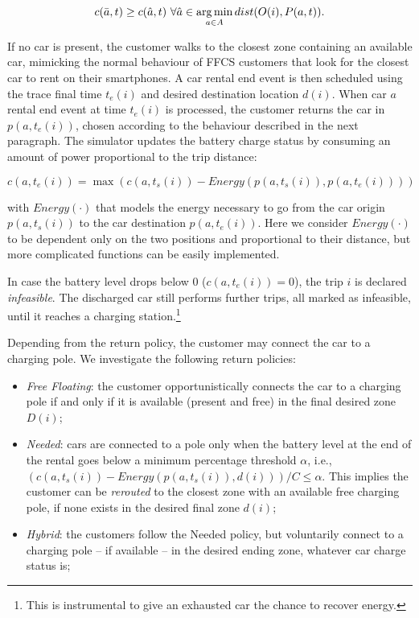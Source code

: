 $$
c(\bar{a},t) \geq c(\hat{a},t)\ \forall \hat{a} \in \operatorname*{arg\,min}_{a \in A} { dist(O(i), P(a,t))}.
$$


If no car is present, the customer walks to the closest zone containing an available car, mimicking the normal behaviour of FFCS customers that look for the closest car to rent on their smartphones.
A car rental end event is then scheduled using the trace final time $t_{e}(i)$ and desired destination location $d(i)$. 
When car $a$ rental end event at time $t_{e}(i)$ is processed, the customer returns the car in  $p(a,t_{e}(i))$, chosen according to the behaviour described in the next paragraph. The simulator updates the battery charge status by consuming an amount of power proportional to the trip distance:

$$
	c(a,t_{e}(i)) =  \max{(c(a,t_{s}(i)) - Energy(p(a,t_{s}(i)), p(a,t_{e}(i))))} 
$$

with $Energy(\cdot)$ that models the energy necessary to go from the car origin $p(a,t_{s}(i))$ to the car destination $p(a,t_{e}(i))$.
Here we consider $Energy(\cdot)$ to be dependent only on the two positions and proportional to their distance, but more complicated functions can be easily implemented.

In case the battery level drops below 0 ($c(a,t_{e}(i)) = 0$), the trip $i$ is declared {\it infeasible}. The discharged car still performs further trips, all marked as infeasible, until it reaches a charging station.\footnote{This is instrumental to give an exhausted car the chance to recover energy.}

Depending from the return policy, the customer may connect the car to a charging pole. We investigate the following return policies:
\begin{itemize}
	\item{\it Free Floating}: the customer opportunistically connects the car to a charging pole if and only if it is available (present and free) in the final desired zone $D(i)$;
	\item{\it Needed}: cars are connected to a pole only when the battery level at the end of the rental goes below a minimum percentage threshold $\alpha$, i.e., $(c(a,t_{s}(i)) - Energy(p(a,t_{s}(i)), d(i))) / C\leq  \alpha $. This implies the customer can be \textit{rerouted} to the closest zone  with an available free charging pole, if none exists in the desired final zone $d(i)$; 
	\item{\it Hybrid}: the customers follow the Needed policy, but voluntarily connect to a charging pole -- if available -- in the desired ending zone, whatever car charge status is;
\end{itemize}

